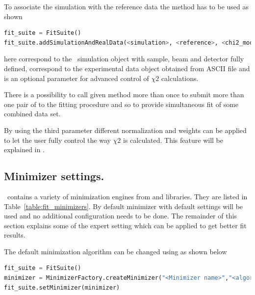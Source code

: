 \vspace*{1mm}

To associate the simulation with the reference data the method \newline
{} has to be used as shown
\begin{lstlisting}[language=python, style=eclipseboxed,numbers=none]
fit_suite = FitSuite()
fit_suite.addSimulationAndRealData(<simulation>, <reference>, <chi2_module>)
\end{lstlisting}

here  correspond to the \BornAgain\ simulation object with sample, beam and detector fully defined,  correspond to the experimental data object obtained from ASCII file and  is an optional parameter for advanced 
control of $\chi2$ calculations.

There is a possibility to call given method more than once to submit more than one pair of
 to the fitting procedure and so to provide simultaneous fit of
some combined data set.

By using the third  parameter different normalization and weights
can be applied to let the user fully control the way $\chi2$ is calculated.
This feature will be explained in .


%
\subsection{Minimizer settings.}

\BornAgain\ contains a variety of minimization engines from  and 
libraries. They are listed in Table~\ref{table:fit_minimizers}.
By default  minimizer with default settings will be used and no additional
configuration needs to be done.
The remainder of this section explains some of the expert setting which can be applied to get better 
fit results.

The default minimization algorithm can be changed using 
 as shown below
\begin{lstlisting}[language=python, style=eclipseboxed,numbers=none]
fit_suite = FitSuite()
minimizer = MinimizerFactory.createMinimizer("<Minimizer name>","<algorithm>")
fit_suite.setMinimizer(minimizer)
\end{lstlisting}

